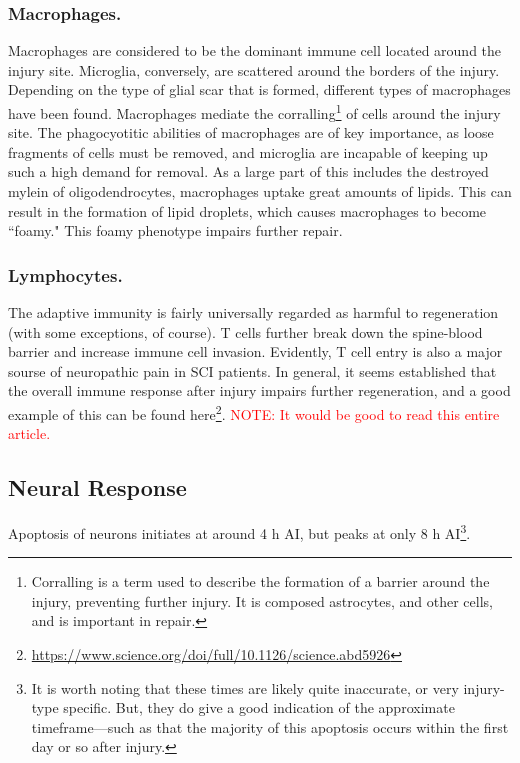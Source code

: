 \documentclass[12pt]{report}
\begin{document}
\subsubsection{Macrophages.}
Macrophages are considered to be the dominant immune cell located around the injury site. Microglia, conversely, are scattered around the borders of the injury. Depending on the type of glial scar that is formed, different types of macrophages have been found. Macrophages mediate the corralling\footnote{Corralling is a term used to describe the formation of a barrier around the injury, preventing further injury. It is composed astrocytes, and other cells, and is important in repair.} of cells around the injury site. The phagocyotitic abilities of macrophages are of key importance, as loose fragments of cells must be removed, and microglia are incapable of keeping up such a high demand for removal. As a large part of this includes the destroyed mylein of oligodendrocytes, macrophages uptake great amounts of lipids. This can result in the formation of lipid droplets, which causes macrophages to become ``foamy." This foamy phenotype impairs further repair. 

\subsubsection{Lymphocytes.} 
The adaptive immunity is fairly universally regarded as harmful to regeneration (with some exceptions, of course). T cells further break down the spine-blood barrier and increase immune cell invasion. Evidently, T cell entry is also a major sourse of neuropathic pain in SCI patients. In general, it seems established that the overall immune response after injury impairs further regeneration, and a good example of this can be found here\footnote{\url{https://www.science.org/doi/full/10.1126/science.abd5926}}. \textcolor{red}{NOTE: It would be good to read this entire article.}

\subsection{Neural Response}

Apoptosis of neurons initiates at around 4 h AI, but peaks at only 8 h AI\footnote{It is worth noting that these times are likely quite inaccurate, or very injury-type specific. But, they do give a good indication of the approximate timeframe---such as that the majority of this apoptosis occurs within the first day or so after injury.}. 
\end{document}
